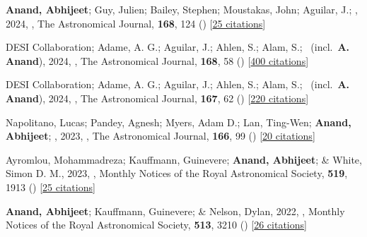 \item[{\color{numcolor}\scriptsize8}] \textbf{Anand, Abhijeet}; Guy, Julien; Bailey, Stephen; Moustakas, John; Aguilar, J.; \etal, 2024, , The Astronomical Journal, \textbf{168}, 124 () [\href{https://ui.adsabs.harvard.edu/abs/2024AJ....168..124A}{25 citations}]

\item[{\color{numcolor}\scriptsize7}] DESI Collaboration; Adame, A. G.; Aguilar, J.; Ahlen, S.; Alam, S.; \etal\ (incl.\ \textbf{A. Anand}), 2024, , The Astronomical Journal, \textbf{168}, 58 () [\href{https://ui.adsabs.harvard.edu/abs/2024AJ....168...58D}{400 citations}]

\item[{\color{numcolor}\scriptsize6}] DESI Collaboration; Adame, A. G.; Aguilar, J.; Ahlen, S.; Alam, S.; \etal\ (incl.\ \textbf{A. Anand}), 2024, , The Astronomical Journal, \textbf{167}, 62 () [\href{https://ui.adsabs.harvard.edu/abs/2024AJ....167...62D}{220 citations}]

\item[{\color{numcolor}\scriptsize5}] Napolitano, Lucas; Pandey, Agnesh; Myers, Adam D.; Lan, Ting-Wen; \textbf{Anand, Abhijeet}; \etal, 2023, , The Astronomical Journal, \textbf{166}, 99 () [\href{https://ui.adsabs.harvard.edu/abs/2023AJ....166...99N}{20 citations}]

\item[{\color{numcolor}\scriptsize4}] Ayromlou, Mohammadreza; Kauffmann, Guinevere; \textbf{Anand, Abhijeet}; \& White, Simon D. M., 2023, , Monthly Notices of the Royal Astronomical Society, \textbf{519}, 1913 () [\href{https://ui.adsabs.harvard.edu/abs/2023MNRAS.519.1913A}{25 citations}]

\item[{\color{numcolor}\scriptsize3}] \textbf{Anand, Abhijeet}; Kauffmann, Guinevere; \& Nelson, Dylan, 2022, , Monthly Notices of the Royal Astronomical Society, \textbf{513}, 3210 () [\href{https://ui.adsabs.harvard.edu/abs/2022MNRAS.513.3210A}{26 citations}]

